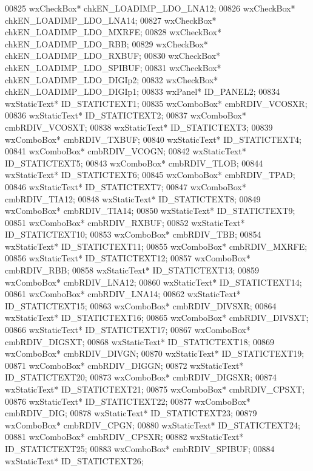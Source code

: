 \begin{DoxyCode}
00825         wxCheckBox* chkEN_LOADIMP_LDO_LNA12;
00826         wxCheckBox* chkEN_LOADIMP_LDO_LNA14;
00827         wxCheckBox* chkEN_LOADIMP_LDO_MXRFE;
00828         wxCheckBox* chkEN_LOADIMP_LDO_RBB;
00829         wxCheckBox* chkEN_LOADIMP_LDO_RXBUF;
00830         wxCheckBox* chkEN_LOADIMP_LDO_SPIBUF;
00831         wxCheckBox* chkEN_LOADIMP_LDO_DIGIp2;
00832         wxCheckBox* chkEN_LOADIMP_LDO_DIGIp1;
00833         wxPanel* ID_PANEL2;
00834         wxStaticText* ID_STATICTEXT1;
00835         wxComboBox* cmbRDIV_VCOSXR;
00836         wxStaticText* ID_STATICTEXT2;
00837         wxComboBox* cmbRDIV_VCOSXT;
00838         wxStaticText* ID_STATICTEXT3;
00839         wxComboBox* cmbRDIV_TXBUF;
00840         wxStaticText* ID_STATICTEXT4;
00841         wxComboBox* cmbRDIV_VCOGN;
00842         wxStaticText* ID_STATICTEXT5;
00843         wxComboBox* cmbRDIV_TLOB;
00844         wxStaticText* ID_STATICTEXT6;
00845         wxComboBox* cmbRDIV_TPAD;
00846         wxStaticText* ID_STATICTEXT7;
00847         wxComboBox* cmbRDIV_TIA12;
00848         wxStaticText* ID_STATICTEXT8;
00849         wxComboBox* cmbRDIV_TIA14;
00850         wxStaticText* ID_STATICTEXT9;
00851         wxComboBox* cmbRDIV_RXBUF;
00852         wxStaticText* ID_STATICTEXT10;
00853         wxComboBox* cmbRDIV_TBB;
00854         wxStaticText* ID_STATICTEXT11;
00855         wxComboBox* cmbRDIV_MXRFE;
00856         wxStaticText* ID_STATICTEXT12;
00857         wxComboBox* cmbRDIV_RBB;
00858         wxStaticText* ID_STATICTEXT13;
00859         wxComboBox* cmbRDIV_LNA12;
00860         wxStaticText* ID_STATICTEXT14;
00861         wxComboBox* cmbRDIV_LNA14;
00862         wxStaticText* ID_STATICTEXT15;
00863         wxComboBox* cmbRDIV_DIVSXR;
00864         wxStaticText* ID_STATICTEXT16;
00865         wxComboBox* cmbRDIV_DIVSXT;
00866         wxStaticText* ID_STATICTEXT17;
00867         wxComboBox* cmbRDIV_DIGSXT;
00868         wxStaticText* ID_STATICTEXT18;
00869         wxComboBox* cmbRDIV_DIVGN;
00870         wxStaticText* ID_STATICTEXT19;
00871         wxComboBox* cmbRDIV_DIGGN;
00872         wxStaticText* ID_STATICTEXT20;
00873         wxComboBox* cmbRDIV_DIGSXR;
00874         wxStaticText* ID_STATICTEXT21;
00875         wxComboBox* cmbRDIV_CPSXT;
00876         wxStaticText* ID_STATICTEXT22;
00877         wxComboBox* cmbRDIV_DIG;
00878         wxStaticText* ID_STATICTEXT23;
00879         wxComboBox* cmbRDIV_CPGN;
00880         wxStaticText* ID_STATICTEXT24;
00881         wxComboBox* cmbRDIV_CPSXR;
00882         wxStaticText* ID_STATICTEXT25;
00883         wxComboBox* cmbRDIV_SPIBUF;
00884         wxStaticText* ID_STATICTEXT26;

\end{DoxyCode}
